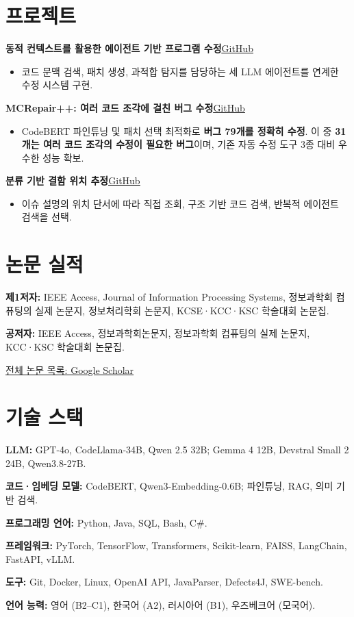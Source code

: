\documentclass[letterpaper,11pt]{article}
\newcommand{\projectHeading}[2]{\textbf{#1}\hfill\href{#2}{\underline{GitHub}}\par}
\begin{document}
\section{프로젝트}
\projectHeading{동적 컨텍스트를 활용한 에이전트 기반 프로그램 수정}{https://github.com/soft7197/dcsa4apr}
\begin{itemize}
  \item 코드 문맥 검색, 패치 생성, 과적합 탐지를 담당하는 세 LLM 에이전트를 연계한 수정 시스템 구현.
\end{itemize}
\projectHeading{MCRepair++: 여러 코드 조각에 걸친 버그 수정}{https://github.com/kimjisung78/MCRepair-Plus-Plus}
\begin{itemize}
  \item CodeBERT 파인튜닝 및 패치 선택 최적화로 \textbf{버그 79개를 정확히 수정}. 이 중 \textbf{31개는 여러 코드 조각의 수정이 필요한 버그}이며, 기존 자동 수정 도구 3종 대비 우수한 성능 확보.
\end{itemize}
\projectHeading{분류 기반 결함 위치 추정}{https://github.com/soft7197/cbfl}
\begin{itemize}
  \item 이슈 설명의 위치 단서에 따라 직접 조회, 구조 기반 코드 검색, 반복적 에이전트 검색을 선택.
\end{itemize}

\section{논문 실적}
\textbf{제1저자:} IEEE Access, Journal of Information Processing Systems, 정보과학회 컴퓨팅의 실제 논문지, 정보처리학회 논문지, KCSE·KCC·KSC 학술대회 논문집.\par
\textbf{공저자:} IEEE Access, 정보과학회논문지, 정보과학회 컴퓨팅의 실제 논문지, KCC·KSC 학술대회 논문집.\par
\href{https://scholar.google.com/citations?user=W-YakaQAAAAJ}{\underline{전체 논문 목록: Google Scholar}}

\section{기술 스택}
\textbf{LLM:} GPT-4o, CodeLlama-34B, Qwen 2.5 32B; Gemma 4 12B, Devstral Small 2 24B, Qwen3.8-27B.\par
\textbf{코드·임베딩 모델:} CodeBERT, Qwen3-Embedding-0.6B; 파인튜닝, RAG, 의미 기반 검색.\par
\textbf{프로그래밍 언어:} Python, Java, SQL, Bash, C\#.\par
\textbf{프레임워크:} PyTorch, TensorFlow, Transformers, Scikit-learn, FAISS, LangChain, FastAPI, vLLM.\par
\textbf{도구:} Git, Docker, Linux, OpenAI API, JavaParser, Defects4J, SWE-bench.\par
\textbf{언어 능력:} 영어 (B2--C1), 한국어 (A2), 러시아어 (B1), 우즈베크어 (모국어).
\end{document}
